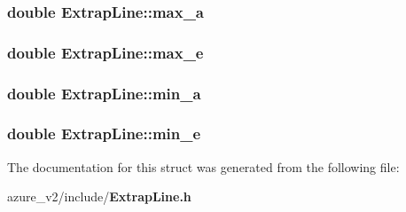 \subsubsection{\setlength{\rightskip}{0pt plus 5cm}double \bf{Extrap\-Line::max\_\-a}}\label{structExtrapLine_107c83e780113efc9b08e243679e5863}


\subsubsection{\setlength{\rightskip}{0pt plus 5cm}double \bf{Extrap\-Line::max\_\-e}}\label{structExtrapLine_aa79404d019d78266a7e84d313d34d84}


\subsubsection{\setlength{\rightskip}{0pt plus 5cm}double \bf{Extrap\-Line::min\_\-a}}\label{structExtrapLine_1998bdaa76a70a2bb908fa78d2eaf352}


\subsubsection{\setlength{\rightskip}{0pt plus 5cm}double \bf{Extrap\-Line::min\_\-e}}\label{structExtrapLine_f861ada6a4f90dcabd5358e21d59fd38}




The documentation for this struct was generated from the following file:\begin{CompactItemize}
\item 
azure\_\-v2/include/\bf{Extrap\-Line.h}\end{CompactItemize}
